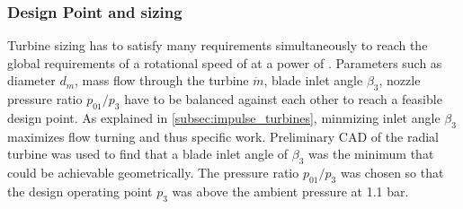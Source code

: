 \subsubsection{Design Point and sizing}

Turbine sizing has to satisfy many requirements simultaneously to reach the global requirements of a rotational speed of \valPumpRpmDesign at a power of \valTurbPowerDesign. Parameters such as diameter $d_m$, mass flow through the turbine $\dot{m}$, blade inlet angle $\beta_3$, nozzle pressure ratio $p_{01}/p_{3}$ have to be balanced against each other to reach a feasible design point. As explained in \cref{subsec:impulse_turbines}, minmizing inlet angle $\beta_3$ maximizes flow turning and thus specific work. Preliminary CAD of the radial turbine was used to find that a blade inlet angle of $\beta_3$ was the minimum that could be achievable geometrically. The pressure ratio $p_{01}/p_{3}$ was chosen so that the design operating point $p_3$ was above the ambient pressure at 1.1 bar. 






